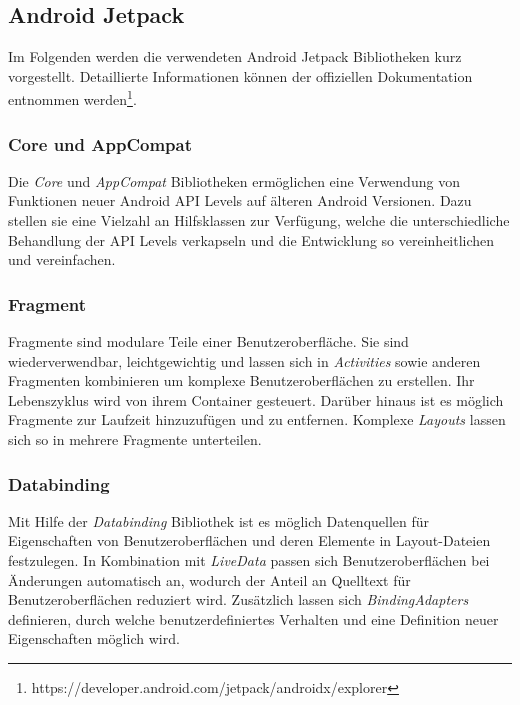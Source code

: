 \documentclass[a4paper, 11pt]{article}
\begin{document}
\subsection{Android Jetpack}
\label{subsec:app:jetpack}
Im Folgenden werden die verwendeten Android Jetpack Bibliotheken kurz vorgestellt. Detaillierte Informationen können der offiziellen Dokumentation entnommen werden\footnote{https://developer.android.com/jetpack/androidx/explorer}.

\subsubsection{Core und AppCompat}
\label{subsubsec:app:jetpack:base}
Die \textit{Core} und \textit{AppCompat} Bibliotheken ermöglichen eine Verwendung von Funktionen neuer Android API Levels auf älteren Android Versionen.
Dazu stellen sie eine Vielzahl an Hilfsklassen zur Verfügung, welche die unterschiedliche Behandlung der API Levels verkapseln und die Entwicklung so vereinheitlichen und vereinfachen.

\subsubsection{Fragment}
\label{subsubsec:app:jetpack:fragment}
Fragmente sind modulare Teile einer Benutzeroberfläche.
Sie sind wiederverwendbar, leichtgewichtig und lassen sich in \textit{Activities} sowie anderen Fragmenten kombinieren um komplexe Benutzeroberflächen zu erstellen.
Ihr Lebenszyklus wird von ihrem Container gesteuert. %
Darüber hinaus ist es möglich Fragmente zur Laufzeit hinzuzufügen und zu entfernen.
Komplexe \textit{Layouts} lassen sich so in mehrere Fragmente unterteilen. %

\subsubsection{Databinding}
\label{subsubsec:app:jetpack:databinding}
Mit Hilfe der \textit{Databinding} Bibliothek ist es möglich Datenquellen für Eigenschaften von Benutzeroberflächen und deren Elemente in Layout-Dateien festzulegen.
In Kombination mit \textit{LiveData} passen sich Benutzeroberflächen bei Änderungen automatisch an, wodurch der Anteil an Quelltext für Benutzeroberflächen reduziert wird.
Zusätzlich lassen sich \textit{BindingAdapters} definieren, durch welche benutzerdefiniertes Verhalten und eine Definition neuer Eigenschaften möglich wird.
\end{document}
